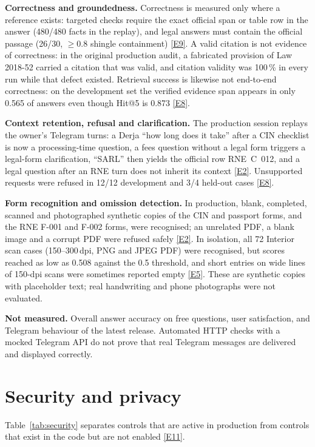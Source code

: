 \documentclass[10pt,a4paper]{article}
\newcommand{\ev}[1]{\hyperref[app:evidence]{[#1]}}
\begin{document}
\textbf{Correctness and groundedness.} Correctness is measured only where a reference exists: targeted checks
require the exact official span or table row in the answer (480/480 facts in the replay), and legal answers must
contain the official passage (26/30, $\geq0.8$ shingle containment) \ev{E9}. A valid citation is not evidence of
correctness: in the original production audit, a fabricated provision of Law 2018-52 carried a citation that
was valid, and citation validity was 100\,\% in every run while that defect existed. Retrieval success is likewise
not end-to-end correctness: on the development set the verified evidence span appears in only 0.565 of answers
even though Hit@5 is 0.873 \ev{E8}.

\textbf{Context retention, refusal and clarification.} The production session replays the owner's Telegram
turns: a Derja ``how long does it take'' after a CIN checklist is now a processing-time question, a fees question
without a legal form triggers a legal-form clarification, ``SARL'' then yields the official row RNE~C~012, and a
legal question after an RNE turn does not inherit its context \ev{E2}. Unsupported requests were refused in
12/12 development and 3/4 held-out cases \ev{E8}.

\textbf{Form recognition and omission detection.} In production, blank, completed, scanned and photographed
synthetic copies of the CIN and passport forms, and the RNE F-001 and F-002 forms, were recognised; an unrelated
PDF, a blank image and a corrupt PDF were refused safely \ev{E2}. In isolation, all 72 Interior scan cases
(150--300\,dpi, PNG and JPEG PDF) were recognised, but scores reached as low as 0.508 against the 0.5 threshold,
and short entries on wide lines of 150-dpi scans were sometimes reported empty \ev{E5}. These are synthetic
copies with placeholder text; real handwriting and phone photographs were not evaluated.

\textbf{Not measured.} Overall answer accuracy on free questions, user satisfaction, and Telegram behaviour of
the latest release. Automated HTTP checks with a mocked Telegram API do not prove that real Telegram messages
are delivered and displayed correctly.

\section{Security and privacy}\label{sec:security}
Table~\ref{tab:security} separates controls that are active in production from controls that exist in the code
but are not enabled \ev{E11}.
\end{document}
